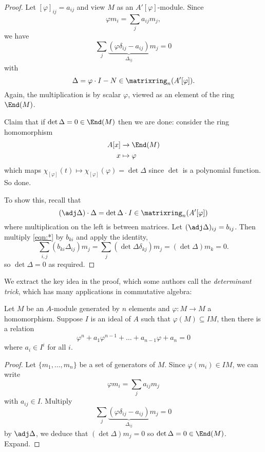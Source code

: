 \documentclass[a4paper]{article}
\begin{document}
\begin{proof}
  Let \([\varphi]_{ij} = a_{ij}\) and view \(M\) as an \(A'[\varphi]\)-module. Since
  \[
    \varphi m_i = \sum_j a_{ij}m_j,
  \]
  we have
  \begin{equation*}
    \label{eqn:*}
    \sum_j \underbrace{(\varphi \delta_{ij} - a_{ij})}_{\Delta_{ij}} m_j = 0
    \tag{\(*\)}
  \end{equation*}
  with
  \[
    \Delta = \varphi \cdot I - N \in \matrixring_n(A'[\varphi]).
  \]
  Again, the multiplication is by scalar \(\varphi\), viewed as an element of the ring \(\End(M)\).

  Claim that if \(\det \Delta = 0 \in \End(M)\) then we are done: consider the ring homomorphism
  \begin{align*}
    A[x] &\to \End(M) \\
    x &\mapsto \varphi
  \end{align*}
  which maps \(\chi_{[\varphi]}(t) \mapsto \chi_{[\varphi]}(\varphi) = \det \Delta\) since \(\det\) is a polynomial function. So done.

  To show this, recall that
  \[
    (\adj \Delta) \cdot \Delta = \det \Delta \cdot I \in \matrixring_n(A'[\varphi])
  \]
  where multiplication on the left is between matrices. Let \((\adj \Delta)_{ij} = b_{ij}\). Then multiply \eqref{eqn:*} by \(b_{ki}\) and apply the identity,
  \[
    \sum_{i, j} (b_{ki} \Delta_{ij}) m_j = \sum_j (\det \Delta \delta_{kj}) m_j = (\det \Delta) m_k = 0.
  \]
  so \(\det \Delta = 0\) as required.
\end{proof}

We extract the key idea in the proof, which some authors call the \emph{determinant trick}, which has many applications in commutative algebra:

\begin{theorem}
  Let \(M\) be an \(A\)-module generated by \(n\) elements and \(\varphi: M \to M\) a homomorphism. Suppose \(I\) is an ideal of \(A\) such that \(\varphi(M) \subseteq IM\), then there is a relation
  \[
    \varphi^n + a_1 \varphi^{n - 1} + \dots + a_{n - 1} \varphi + a_n = 0
  \]
  where \(a_i \in I^i\) for all \(i\).
\end{theorem}

\begin{proof}
  Let \(\{m_1, \dots, m_n\}\) be a set of generators of \(M\). Since \(\varphi(m_i) \in IM\), we can write
  \[
    \varphi m_i = \sum_j a_{ij}m_j
  \]
  with \(a_{ij} \in I\). Multiply
  \[
    \sum_j \underbrace{(\varphi \delta_{ij} - a_{ij})}_{\Delta_{ij}} m_j = 0 
  \]
  by \(\adj \Delta\), we deduce that \((\det \Delta) m_j = 0\) so \(\det \Delta = 0 \in \End(M)\). Expand.
\end{proof}
\end{document}
